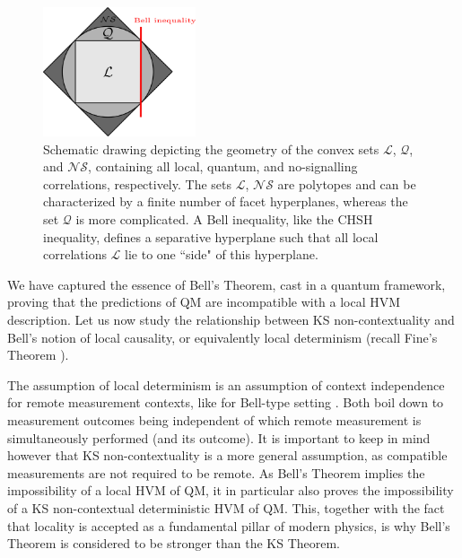 \begin{figure}
    \centering
    \includegraphics[width=0.4\textwidth]{images/correlations.png}
    \caption{Schematic drawing depicting the geometry of the convex sets $\mathcal{L}$, $\mathcal{Q}$, and $\mathcal{NS}$, containing all local, quantum, and no-signalling correlations, respectively. The sets $\mathcal{L}$, $\mathcal{NS}$ are polytopes and can be characterized by a finite number of facet hyperplanes, whereas the set $\mathcal{Q}$ is more complicated. A Bell inequality, like the CHSH inequality, defines a separative hyperplane such that all local correlations $\mathcal{L}$ lie to one ``side" of this hyperplane.}
    \label{fig:correlations}
\end{figure}

We have captured the essence of Bell's Theorem, cast in a quantum framework, proving that the predictions of QM are incompatible with a local HVM description. Let us now study the relationship between KS non-contextuality and Bell's notion of local causality, or equivalently local determinism (recall Fine's Theorem \cite{Fine1982}). 

The assumption of local determinism is an assumption of context independence for remote measurement contexts, like for Bell-type setting \cite{Spekkens2012}. Both boil down to measurement outcomes being independent of which remote measurement is simultaneously performed (and its outcome). It is important to keep in mind however that KS non-contextuality is a more general assumption, as compatible measurements are not required to be remote.
As Bell's Theorem implies the impossibility of a local HVM of QM, it in particular also proves the impossibility of a KS non-contextual deterministic HVM of QM. This, together with the fact that locality is accepted as a fundamental pillar of modern physics, is why Bell's Theorem is considered to be stronger than the KS Theorem. 


